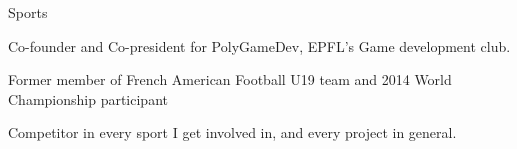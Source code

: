 


\begin{cventries}


\cventry
{Sports} %
{}
{}
{}
{ %
\begin{cvitems}
\item {Co-founder and Co-president for PolyGameDev, EPFL's Game development club.}
\item {Former member of French American Football U19 team and 2014 World Championship participant}
\item {Competitor in every sport I get involved in, and every project in general.}
\end{cvitems}
}




\end{cventries}